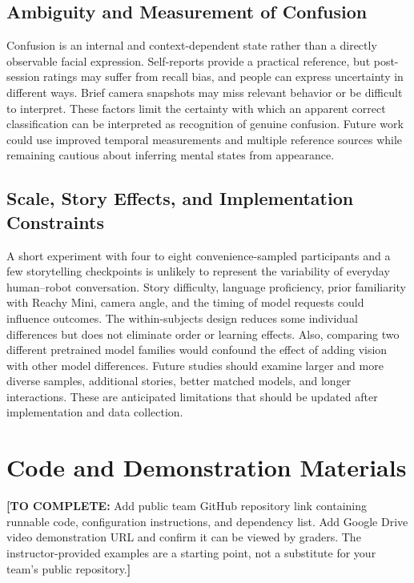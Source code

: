 \documentclass[conference]{IEEEtran}
\newcommand{\drafttodo}[1]{\par\smallskip\noindent\textcolor{red!65!black}{\textbf{[TO COMPLETE:} #1\textbf{]}}\par\smallskip}
\begin{document}
\subsection{Ambiguity and Measurement of Confusion}
Confusion is an internal and context-dependent state rather than a directly observable facial expression. Self-reports provide a practical reference, but post-session ratings may suffer from recall bias, and people can express uncertainty in different ways. Brief camera snapshots may miss relevant behavior or be difficult to interpret. These factors limit the certainty with which an apparent correct classification can be interpreted as recognition of genuine confusion. Future work could use improved temporal measurements and multiple reference sources while remaining cautious about inferring mental states from appearance.

\subsection{Scale, Story Effects, and Implementation Constraints}
A short experiment with four to eight convenience-sampled participants and a few storytelling checkpoints is unlikely to represent the variability of everyday human--robot conversation. Story difficulty, language proficiency, prior familiarity with Reachy Mini, camera angle, and the timing of model requests could influence outcomes. The within-subjects design reduces some individual differences but does not eliminate order or learning effects. Also, comparing two different pretrained model families would confound the effect of adding vision with other model differences. Future studies should examine larger and more diverse samples, additional stories, better matched models, and longer interactions. These are anticipated limitations that should be updated after implementation and data collection.

\section*{Code and Demonstration Materials}
\drafttodo{Add public team GitHub repository link containing runnable code, configuration instructions, and dependency list. Add Google Drive video demonstration URL and confirm it can be viewed by graders. The instructor-provided examples are a starting point, not a substitute for your team's public repository.}
\end{document}
